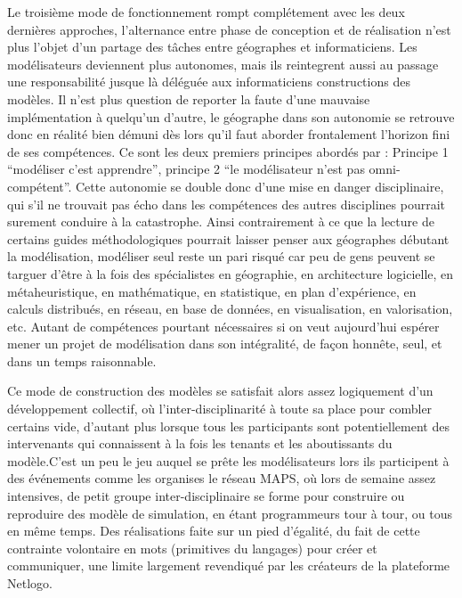 Le troisième mode de fonctionnement rompt complétement avec les deux dernières approches, l'alternance entre phase de conception et de réalisation n'est plus l'objet d'un partage des tâches entre géographes et informaticiens. Les modélisateurs deviennent plus autonomes, mais ils reintegrent aussi au passage une responsabilité jusque là déléguée aux informaticiens constructions des modèles. Il n'est plus question de reporter la faute d'une mauvaise implémentation à quelqu'un d'autre, le géographe dans son autonomie se retrouve donc en réalité bien démuni dès lors qu'il faut aborder frontalement l'horizon fini de ses compétences. Ce sont les deux premiers principes abordés par \textcite[77]{Banos2013} : Principe 1 \enquote{modéliser c'est apprendre}, principe  2 \enquote{le modélisateur n'est pas omni-compétent}. Cette autonomie se double donc d'une mise en danger disciplinaire, qui s'il ne trouvait pas écho dans les compétences des autres disciplines pourrait surement conduire à la catastrophe. Ainsi contrairement à ce que la lecture de certains guides méthodologiques pourrait laisser penser aux géographes débutant la modélisation, modéliser seul reste un pari risqué car peu de gens peuvent se targuer d'être à la fois des spécialistes en géographie, en architecture logicielle, en métaheuristique, en mathématique, en statistique, en plan d'expérience, en calculs distribués, en réseau, en base de données, en visualisation, en valorisation, etc. Autant de compétences pourtant nécessaires si on veut aujourd'hui espérer mener un projet de modélisation dans son intégralité, de façon honnête, seul, et dans un temps raisonnable. 


Ce mode de construction des modèles se satisfait alors assez logiquement d'un développement collectif, où l'inter-disciplinarité à toute sa place pour combler certains vide, d'autant plus lorsque tous les participants sont potentiellement des intervenants qui connaissent à la fois les tenants et les aboutissants du modèle.C'est un peu le jeu auquel se prête les modélisateurs lors ils participent à des événements comme les organises le réseau MAPS, où lors de semaine assez intensives, de petit groupe inter-disciplinaire se forme pour construire ou reproduire des modèle de simulation, en étant programmeurs tour à tour, ou tous en même temps. Des réalisations faite sur un pied d'égalité, du fait de cette contrainte volontaire en mots (primitives du langages) pour créer et communiquer, une limite largement revendiqué par les créateurs de la plateforme Netlogo.

